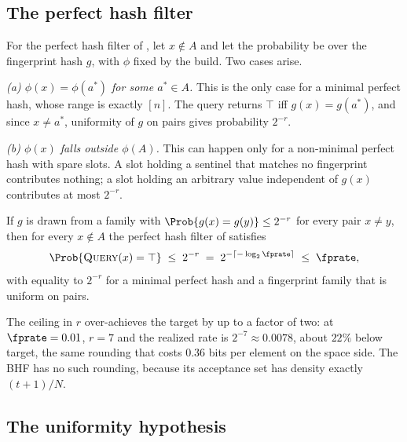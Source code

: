 \subsection*{The perfect hash filter}

For the perfect hash filter of , let $x \notin A$ and let
the probability be over the fingerprint hash $g$, with $\phi$ fixed by
the build. Two cases arise.

\smallskip
\noindent\emph{(a) $\phi(x) = \phi(a^{*})$ for some $a^{*} \in A$.}
This is the only case for a minimal perfect hash, whose range is exactly
$[n]$. The query returns $\top$ iff $g(x) = g(a^{*})$, and since $x \neq
a^{*}$, uniformity of $g$ on pairs gives probability $2^{-r}$.

\smallskip
\noindent\emph{(b) $\phi(x)$ falls outside $\phi(A)$.} This can happen
only for a non-minimal perfect hash with spare slots. A slot holding a
sentinel that matches no fingerprint contributes nothing; a slot holding
an arbitrary value independent of $g(x)$ contributes at most $2^{-r}$.

\begin{proposition}
\label{prop:phf-fpr}
If $g$ is drawn from a family with $\Prob{g(x) = g(y)} \le 2^{-r}$ for
every pair $x \neq y$, then for every $x \notin A$ the perfect hash
filter of  satisfies
\[
  \Prob{\textsc{Query}(x) = \top} \;\le\; 2^{-r}
  \;=\; 2^{-\lceil -\log_2 \fprate \rceil} \;\le\; \fprate,
\]
with equality to $2^{-r}$ for a minimal perfect hash and a fingerprint
family that is uniform on pairs.
\end{proposition}

The ceiling in $r$ over-achieves the target by up to a factor of two: at
$\fprate = 0.01$, $r = 7$ and the realized rate is $2^{-7} \approx
0.0078$, about $22\%$ below target, the same rounding that costs $0.36$
bits per element on the space side. The BHF has no such rounding, because
its acceptance set has density exactly $(t + 1)/N$.

\subsection*{The uniformity hypothesis}


